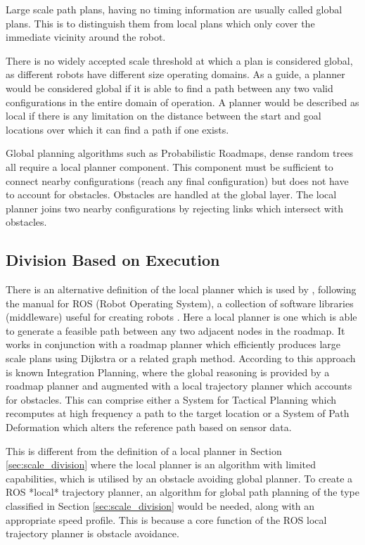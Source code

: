 Large scale path plans, having no timing information are usually called global plans. This is to distinguish them from local plans which only cover the immediate vicinity around the robot. 

There is no widely accepted scale threshold at which a plan is considered global, as different robots have different size operating domains. As a guide, a planner would be considered global if it is able to find a path between any two valid configurations in the entire domain of operation. A planner would be described as local if there is any limitation on the distance between the start and goal locations over which it can find a path if one exists. 

Global planning algorithms such as Probabilistic Roadmaps, dense random trees all require a local planner component. This component must be sufficient to connect nearby configurations (reach any final configuration) but does not have to account for obstacles. Obstacles are handled at the global layer. The local planner joins two nearby configurations by rejecting links which intersect with obstacles.  

\subsection{Division Based on Execution} 
There is an alternative definition of the local planner which is used by \cite{Walenta2017}, following the manual for ROS (Robot Operating System), a collection of software libraries (middleware) useful for creating robots \cite{rosbook2016}. Here a local planner is one which is able to generate a feasible path between any two adjacent nodes in the roadmap. It works in conjunction with a roadmap planner which efficiently produces large scale plans using Dijkstra or a related graph method. According to \cite{SicilianoKhatib2016} this approach is known Integration Planning, where the global reasoning is provided by a roadmap planner and augmented with a local trajectory planner which accounts for obstacles. This can comprise either a System for Tactical Planning which recomputes at high frequency a path to the target location or a System of Path Deformation which alters the reference path based on sensor data.

This is different from the definition of a local planner in Section \ref{sec:scale_division} where the local planner is an algorithm with limited capabilities, which is utilised by an obstacle avoiding global planner. To create a ROS *local* trajectory planner, an algorithm for global path planning of the type classified in Section \ref{sec:scale_division} would be needed, along with an appropriate speed profile. This is because a core function of the ROS local trajectory planner is obstacle avoidance.


